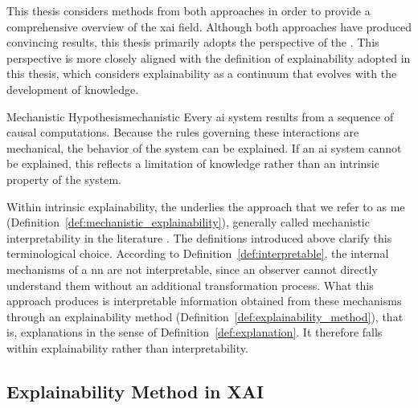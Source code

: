 This thesis considers methods from both approaches in order to provide a comprehensive overview of the \gls{xai} field.
Although both approaches have produced convincing results, this thesis primarily adopts the perspective of the \MechanisticHypothesisName \parencite{Siegel_Craver_2024, zednik2019solving}.
This perspective is more closely aligned with the definition of explainability adopted in this thesis, which considers explainability as a continuum that evolves with the development of knowledge.

\begin{hypothesis}{Mechanistic Hypothesis}{mechanistic}
Every \gls{ai} system results from a sequence of causal computations.
Because the rules governing these interactions are mechanical, the behavior of the system can be explained.
If an \gls{ai} system cannot be explained, this reflects a limitation of knowledge rather than an intrinsic property of the system.
\end{hypothesis}

Within intrinsic explainability, the \MechanisticHypothesisName underlies the approach that we refer to as \gls{me} (Definition~\ref{def:mechanistic_explainability}), generally called mechanistic interpretability in the literature \parencite{olah2020zoom}.
The definitions introduced above clarify this terminological choice.
According to Definition~\ref{def:interpretable}, the internal mechanisms of a \gls{nn} are not interpretable, since an observer cannot directly understand them without an additional transformation process.
What this approach produces is interpretable information obtained from these mechanisms through an explainability method (Definition~\ref{def:explainability_method}), that is, explanations in the sense of Definition~\ref{def:explanation}.
It therefore falls within explainability rather than interpretability.

\subsection{Explainability Method in XAI}
\label{subsec:explainability_method}

